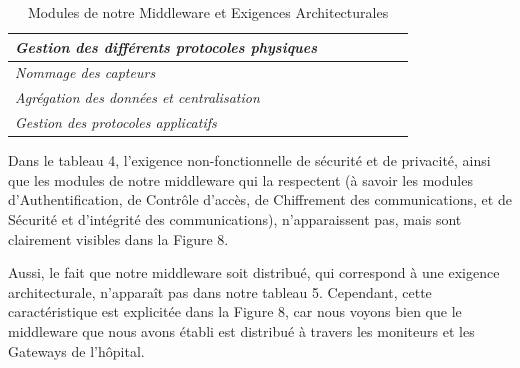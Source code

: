 \begin{table}[h!]
\begin{tabular}{|l|c|c|c|c|c|c|}
		\textit{Gestion des différents protocoles physiques} &                                                                                       & \checkmark                &                                                                            & \checkmark            &                                                                   &                    \\ \hline
		\textit{Nommage des capteurs}                        &                                                                                       & \checkmark                &                                                                            & \checkmark            &                                                                   &                    \\ \hline
		\textit{Agrégation des données et centralisation}    &                                                                                       & \checkmark                &                                                                            & \checkmark            & \checkmark                                                        &                    \\ \hline
		\textit{Gestion des protocoles applicatifs}          &                                                                                       & \checkmark                &                                                                            & \checkmark            &                                                                   &                    \\ \hline
	\end{tabular}
	\caption{Modules de notre Middleware et Exigences Architecturales}
\end{table}

Dans le tableau 4, l'exigence non-fonctionnelle de sécurité et de privacité, ainsi que les modules de notre middleware qui la respectent (à savoir les modules d'Authentification, de Contrôle d'accès, de Chiffrement des communications, et de Sécurité et d'intégrité des communications), n'apparaissent pas, mais sont clairement visibles dans la Figure 8. 

Aussi, le fait que notre middleware soit distribué, qui correspond à une exigence architecturale, n'apparaît pas dans notre tableau 5. Cependant, cette caractéristique est explicitée dans la Figure 8, car nous voyons bien que le middleware que nous avons établi est distribué à travers les moniteurs et les Gateways de l'hôpital.

